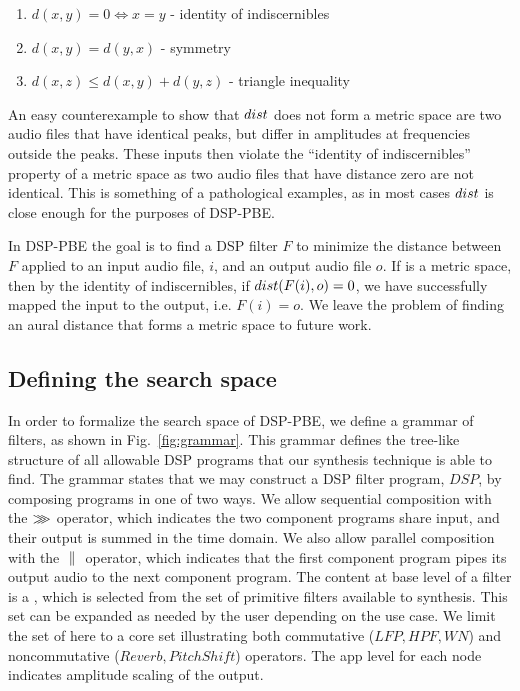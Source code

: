 \begin{enumerate}
  \item $d(x,y) = 0 \Leftrightarrow x = y$ - identity of indiscernibles
  \item $d(x,y)  = d(y,x)$ - symmetry
  \item $d(x,z) \le d(x,y) + d(y, z)$ - triangle inequality
\end{enumerate}

An easy counterexample to show that $dist$ does not form a metric space are two audio files that have identical peaks, but differ in amplitudes at frequencies outside the peaks.
These inputs then violate the ``identity of indiscernibles'' property of a metric space as two audio files that have distance zero are not identical.
This is something of a pathological examples, as in most cases $dist$ is close enough for the purposes of DSP-PBE.

In DSP-PBE the goal is to find a DSP filter $F$ to minimize the distance between $F$ applied to an input audio file, $i$, and an output audio file $o$.
If \distFxn is a metric space, then by the identity of indiscernibles, if $dist(F(i),o) = 0$, we have successfully mapped the input to the output, i.e. $F(i) = o$.
We leave the problem of finding an aural distance that forms a metric space to future work.
 

\subsection{Defining the search space}

In order to formalize the search space of DSP-PBE, we define a grammar of filters, as shown in Fig.~\ref{fig:grammar}.
This grammar defines the tree-like structure of all allowable DSP programs that our synthesis technique is able to find.
The grammar states that we may construct a DSP filter program, $DSP$, by composing programs in one of two ways.
We allow sequential composition with the $>\mkern-9mu>\mkern-9mu>$ operator, which indicates the two component programs share input, and their output is summed in the time domain.
We also allow parallel composition with the $\ |\mkern-2mu|\ $ operator, which indicates that the first component program pipes its output audio to the next component program.
The content at base level of a filter is a \dspnode, which is selected from the set of primitive filters available to synthesis.
This set can be expanded as needed by the user depending on the use case.
We limit the set of \dspnode here to a core set illustrating both commutative ($LFP, HPF, WN$) and noncommutative ($Reverb, PitchShift$) operators.
The app level for each node indicates amplitude scaling of the output.

